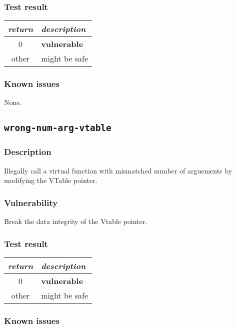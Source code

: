 \documentclass[a4paper]{book}
\begin{document}
\subsubsection{Test result}
\begin{tabular}{cl}
  \toprule
  \emph{return}  & \emph{description} \\
  \midrule
  0              & \textbf{vulnerable} \\
  other          & might be safe \\
  \bottomrule
\end{tabular}

\subsubsection{Known issues}
None.

\newpage
\subsection{\texttt{wrong-num-arg-vtable}}\label{test-wrong-num-arg-vtable}

\subsubsection{Description}
Illegally call a virtual function with mismatched number of arguements by modifying the VTable pointer.

\subsubsection{Vulnerability}
Break the data integrity of the Vtable pointer.

\subsubsection{Test result}
\begin{tabular}{cl}
  \toprule
  \emph{return}  & \emph{description} \\
  \midrule
  0              & \textbf{vulnerable} \\
  other          & might be safe \\
  \bottomrule
\end{tabular}

\subsubsection{Known issues}
\end{document}
